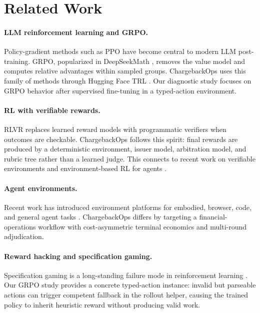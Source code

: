 \documentclass[11pt]{article}
\begin{document}
\section{Related Work}

\paragraph{LLM reinforcement learning and GRPO.}
Policy-gradient methods such as PPO \cite{schulman2017ppo} have become central to modern LLM post-training. GRPO, popularized in DeepSeekMath \cite{shao2024deepseekmath}, removes the value model and computes relative advantages within sampled groups. ChargebackOps uses this family of methods through Hugging Face TRL \cite{trl}. Our diagnostic study focuses on GRPO behavior after supervised fine-tuning in a typed-action environment.

\paragraph{RL with verifiable rewards.}
RLVR replaces learned reward models with programmatic verifiers when outcomes are checkable. ChargebackOps follows this spirit: final rewards are produced by a deterministic environment, issuer model, arbitration model, and rubric tree rather than a learned judge. This connects to recent work on verifiable environments and environment-based RL for agents \cite{lambert2024tulu3, rlve2025}.

\paragraph{Agent environments.}
Recent work has introduced environment platforms for embodied, browser, code, and general agent tasks \cite{browsergym, gem2025}. ChargebackOps differs by targeting a financial-operations workflow with cost-asymmetric terminal economics and multi-round adjudication.

\paragraph{Reward hacking and specification gaming.}
Specification gaming is a long-standing failure mode in reinforcement learning \cite{krakovna2020specification,weng2024rewardhacking,skalse2022rewardhacking}. Our GRPO study provides a concrete typed-action instance: invalid but parseable actions can trigger competent fallback in the rollout helper, causing the trained policy to inherit heuristic reward without producing valid work.
\end{document}
